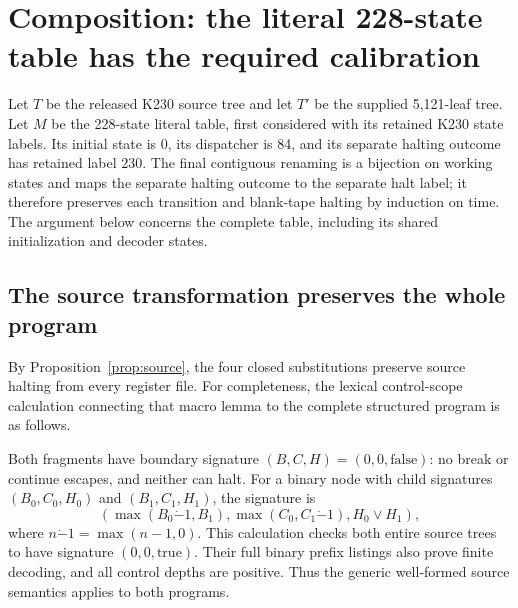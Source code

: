 \section{Composition: the literal 228-state table has the required calibration}
\label{sec:composition}

Let $T$ be the released K230 source tree and let $T'$ be the supplied
5,121-leaf tree.  Let $M$ be the 228-state literal table, first considered
with its retained K230 state labels.  Its initial state is 0, its dispatcher
is 84, and its separate halting outcome has retained label 230.
The final contiguous renaming is a bijection on working states and maps
the separate halting outcome to the separate halt label; it therefore
preserves each transition and blank-tape halting by induction on time.
The argument below concerns the complete table, including its shared
initialization and decoder states.

\subsection{The source transformation preserves the whole program}

By Proposition~\ref{prop:source}, the four closed substitutions preserve
source halting from every register file. For completeness, the lexical
control-scope calculation connecting that macro lemma to the complete
structured program is as follows.

Both fragments have boundary signature $(B,C,H)=(0,0,\mathrm{false})$:
no break or continue escapes, and neither can halt.  For a binary node
with child signatures $(B_0,C_0,H_0)$ and $(B_1,C_1,H_1)$, the signature is
\[
 \left(\max(B_0\mathbin{\dot-}1,B_1),
       \max(C_0,C_1\mathbin{\dot-}1),H_0\lor H_1\right),
\]
where $n\mathbin{\dot-}1=\max(n-1,0)$.
This calculation checks both entire source trees to have signature
$(0,0,\mathrm{true})$.  Their full binary prefix listings also prove
finite decoding, and all control depths are positive.  Thus the generic
well-formed source semantics applies to both programs.

